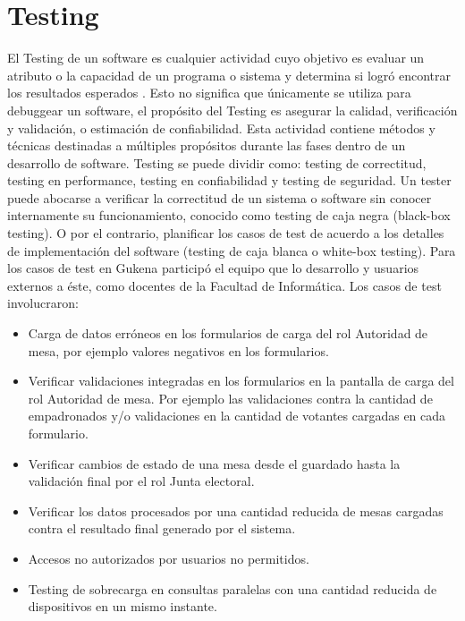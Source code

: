 \section{Testing}
El Testing de un software es cualquier actividad cuyo objetivo es evaluar un atributo o la capacidad de un programa o sistema y determina si logró encontrar los resultados esperados \cite{pan1999software}. Esto no significa que únicamente se utiliza para debuggear un software, el propósito del Testing es asegurar la calidad, verificación y validación, o estimación de confiabilidad. Esta actividad contiene métodos y técnicas destinadas a múltiples propósitos durante las fases dentro de un desarrollo de software. Testing se puede dividir como: testing de correctitud, testing en performance, testing en confiabilidad y testing de seguridad. Un tester puede abocarse a verificar la correctitud de un sistema o software sin conocer internamente su funcionamiento, conocido como testing de caja negra (black-box testing). O por el contrario, planificar los casos de test de acuerdo a los detalles de implementación del software (testing de caja blanca o white-box testing). \newline
Para los casos de test en Gukena participó el equipo que lo desarrollo y usuarios externos a éste, como docentes de la Facultad de Informática. Los casos de test involucraron:
\begin{itemize}
    \item Carga de datos erróneos en los formularios de carga del rol Autoridad de mesa, por ejemplo valores negativos en los formularios.
    \item Verificar validaciones integradas en los formularios en la pantalla de carga del rol Autoridad de mesa. Por ejemplo las validaciones contra la cantidad de empadronados y/o validaciones en la cantidad de votantes cargadas en cada formulario.
    \item Verificar cambios de estado de una mesa desde el guardado hasta la validación final por el rol Junta electoral.
    \item Verificar los datos procesados por una cantidad reducida de mesas cargadas contra el resultado final generado por el sistema.
    \item Accesos no autorizados por usuarios no permitidos.
    \item Testing de sobrecarga en consultas paralelas con una cantidad reducida de dispositivos en un mismo instante.
\end{itemize}